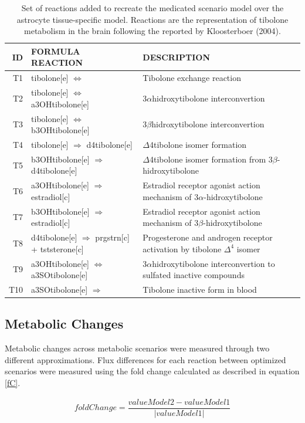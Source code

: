 \begin{table}[h]
\caption{Set of reactions added to recreate the medicated scenario model over the astrocyte tissue-specific model. Reactions are the representation of tibolone metabolism in the brain following the reported by Kloosterboer (2004).}
\label{Tibolone}
\begin{center}
\begin{tabular}{rlm{7cm}}
\hline
ID & FORMULA REACTION & DESCRIPTION \\
\hline
\hline
T1 & tibolone[e] $\Leftrightarrow$ & Tibolone exchange reaction\\
T2 & tibolone[e] $\Leftrightarrow$ a3OHtibolone[e] & 3$\alpha$hidroxytibolone interconvertion\\
T3 & tibolone[e] $\Leftrightarrow$ b3OHtibolone[e] & 3$\beta$hidroxytibolone interconvertion \\
T4 & tibolone[e] $\Rightarrow$ d4tibolone[e] & $\Delta$4tibolone isomer formation \\
T5 & b3OHtibolone[e] $\Rightarrow$ d4tibolone[e] &  $\Delta$4tibolone isomer formation from 3$\beta$-hidroxytibolone \\
T6 & a3OHtibolone[e] $\Rightarrow$ estradiol[c] & Estradiol receptor agonist action mechanism of 3$\alpha$-hidroxytibolone\\
T7 & b3OHtibolone[e] $\Rightarrow$ estradiol[c] & Estradiol receptor agonist action mechanism of 3$\beta$-hidroxytibolone\\
T8 & d4tibolone[e] $\Rightarrow$ prgstrn[c] + tststerone[c] & Progesterone and androgen receptor activation by tibolone $\Delta^4$ isomer\\
T9 & a3OHtibolone[e] $\Leftrightarrow$ a3SOtibolone[e] & 3$\alpha$hidroxytibolone interconvertion to sulfated inactive compounds \\
T10 & a3SOtibolone[e] $\Rightarrow$ & Tibolone inactive form in blood \\ 
\hline
\end{tabular}
\end{center}
\end{table} 

\subsection*{Metabolic Changes}
Metabolic changes across metabolic scenarios were measured through two different approximations. Flux differences for each reaction between optimized scenarios were measured using the fold change calculated as described in equation \ref{fC}.
\begin{ceqn}
\begin{align}
\label{fC}
   foldChange = \dfrac{valueModel2-valueModel1}{\left|valueModel1\right|}
\end{align}
\end{ceqn}

